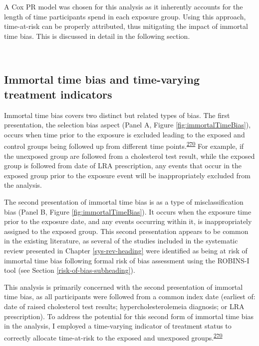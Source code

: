 \documentclass[a4paper, twoside]{templates/ociamthesis}
\begin{document}
A Cox PR model was chosen for this analysis as it inherently accounts for the length of time participants spend in each exposure group. Using this approach, time-at-risk can be properly attributed, thus mitigating the impact of immortal time bias. This is discussed in detail in the following section.

~

\hypertarget{cprd-immortal-time-bias}{%
\subsection{Immortal time bias and time-varying treatment indicators}\label{cprd-immortal-time-bias}}

Immortal time bias covers two distinct but related types of bias. The first presentation, the selection bias aspect (Panel A, Figure \ref{fig:immortalTimeBias}), occurs when time prior to the exposure is excluded leading to the exposed and control groups being followed up from different time points.\textsuperscript{\protect\hyperlink{ref-levesque2010}{270}} For example, if the unexposed group are followed from a cholesterol test result, while the exposed group is followed from date of LRA prescription, any events that occur in the exposed group prior to the exposure event will be inappropriately excluded from the analysis.

The second presentation of immortal time bias is as a type of misclassification bias (Panel B, Figure \ref{fig:immortalTimeBias}). It occurs when the exposure time prior to the exposure date, and any events occurring within it, is inappropriately assigned to the exposed group. This second presentation appears to be common in the existing literature, as several of the studies included in the systematic review presented in Chapter \ref{sys-rev-heading} were identified as being at risk of immortal time bias following formal risk of bias assessment using the ROBINS-I tool (see Section \ref{risk-of-bias-subheading}).

This analysis is primarily concerned with the second presentation of immortal time bias, as all participants were followed from a common index date (earliest of: date of raised cholesterol test results; hypercholesterolemeia diagnosis; or LRA prescription). To address the potential for this second form of immortal time bias in the analysis, I employed a time-varying indicator of treatment status to correctly allocate time-at-risk to the exposed and unexposed groups.\textsuperscript{\protect\hyperlink{ref-levesque2010}{270}}
\end{document}
